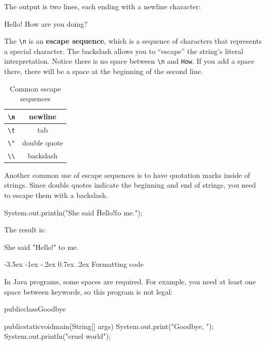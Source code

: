 \documentclass[12pt]{book}
\makeatletter
\theoremstyle{exercise}
\renewcommand{\section}{\@startsection{section}{1}{\z@}%
    {-3.5ex \@plus -1ex \@minus -.2ex}%
    {0.7ex \@plus.2ex}%
    {\normalfont\Large\bfseries}}
\makeatother
\begin{document}
The output is two lines, each ending with a newline character:

\begin{stdout}
Hello!
How are you doing?
\end{stdout}


The \verb"\n" is an {\bf escape sequence}, which is a sequence of characters that represents a special character.
The backslash allows you to ``escape'' the string's literal interpretation.
Notice there is no space between \verb"\n" and \verb"How".
If you add a space there, there will be a space at the beginning of the second line.

\begin{table}[!h]
\begin{center}
\begin{tabular}{|c|c|}
\hline
\verb"\n" & newline \\
\hline
\verb"\t" & tab \\
\hline
\verb'\"' & double quote \\
\hline
\verb"\\" & backslash \\
\hline
\end{tabular}
\caption{Common escape sequences}
\end{center}
\end{table}

Another common use of escape sequences is to have quotation marks inside of strings.
Since double quotes indicate the beginning and end of strings, you need to escape them with a backslash.

\begin{code}
    System.out.println("She said \"Hello!\" to me.");
\end{code}

The result is:

\begin{stdout}
She said "Hello!" to me.
\end{stdout}


\section{Formatting code}
\label{formatting}

In Java programs, some spaces are required.
For example, you need at least one space between keywords, so this program is not legal:

\begin{code}
publicclassGoodbye{

    publicstaticvoidmain(String[] args) {
        System.out.print("Goodbye, ");
        System.out.println("cruel world");
    }
}
\end{code}
\end{document}
